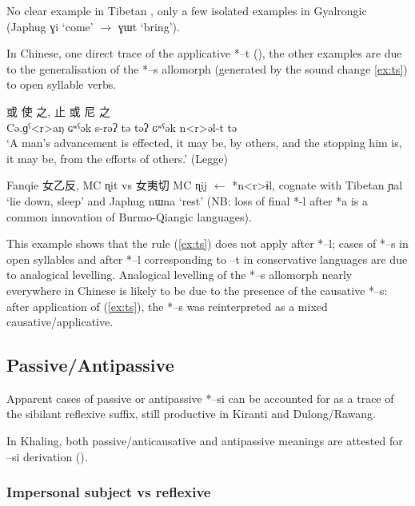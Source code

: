 \documentclass[oldfontcommands,oneside,a4paper,11pt]{article}
\newcommand{\ipa}[1]{{\phon \mbox{#1}}} %
\newcommand{\zh}[1]{{\cn #1}}
\begin{document}
No clear example in Tibetan \citet[630]{hill14derivational}, only a few isolated examples in Gyalrongic (Japhug \ipa{ɣi} `come' $\rightarrow$ \ipa{ɣɯt} `bring'). 

In Chinese, one direct trace of the applicative *\ipa{--t} (\citealt{sagart04directions}), the other examples are due to the generalisation of the *\ipa{--s} allomorph (generated by the sound change \ref{ex:ts}) to open syllable verbs. 

\begin{exe}
\ex 
\gll \zh{行} \zh{或} \zh{使} \zh{之}, \zh{止} \zh{或} \zh{尼} \zh{之} \\
 \ipa{Cə.ɡˁ<r>aŋ}  \ipa{ɢʷˁək}  \ipa{s-rəʔ}  \ipa{tə}  \ipa{təʔ}  \ipa{ɢʷˁək}  \ipa{n<r>əl-t}  \ipa{tə} \\
\glt `A man's advancement is effected, it may be, by others, and the stopping him is, it may be, from the efforts of others.' (Legge)
\end{exe}


Fanqie \zh{女乙反}, MC \ipa{ɳit} vs \zh{女夷切} MC \ipa{ɳij} $\leftarrow$ *\ipa{n<r>ɨl}, cognate with Tibetan \ipa{ɲal} `lie down, sleep' and Japhug \ipa{nɯna} `rest' (NB: loss of final *\ipa{-l} after *\ipa{a} is a common innovation of Burmo-Qiangic languages). 

This example shows that the rule (\ref{ex:ts}) does not apply after *\ipa{--l}; cases of *\ipa{--s} in open syllables and after *\ipa{--l} corresponding to \ipa{--t} in conservative languages are due to analogical levelling. Analogical levelling of the *\ipa{--s} allomorph nearly everywhere in Chinese is likely to be due to the presence of the causative *\ipa{--s}: after application of (\ref{ex:ts}), the *\ipa{--s} was reinterpreted as a mixed causative/applicative.

\subsection{Passive/Antipassive}
Apparent cases of passive or antipassive *\ipa{--si} can be accounted for as a trace of the sibilant reflexive suffix, still productive in Kiranti and Dulong/Rawang.

In Khaling, both passive/anticausative and antipassive meanings are attested for \ipa{--si} derivation (\citealt{jacques16si}).
\subsubsection{Impersonal subject vs reflexive} 
\end{document}
